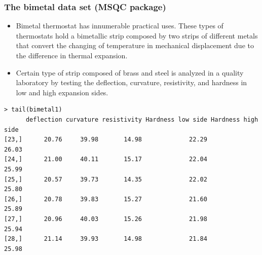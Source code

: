 \documentclass[SPC-MASTER.tex]{subfiles}
\begin{document}
\subsubsection{The bimetal data set (MSQC package)}
{\large
\begin{itemize}
\item Bimetal thermostat has innumerable practical uses. These types of thermostats hold
a bimetallic strip composed by two strips of different metals that convert the
changing of temperature in mechanical displacement due to the difference in
thermal expansion.
\item Certain type of strip composed of brass and steel is analyzed in a quality
laboratory by testing the deflection, curvature, resistivity, and hardness in low
and high expansion sides.
\end{itemize}
{
\large

\begin{verbatim}
> tail(bimetal1)
      deflection curvature resistivity Hardness low side Hardness high side
[23,]      20.76     39.98       14.98             22.29             26.03
[24,]      21.00     40.11       15.17             22.04             25.99
[25,]      20.57     39.73       14.35             22.02             25.80
[26,]      20.78     39.83       15.27             21.60             25.89
[27,]      20.96     40.03       15.26             21.98             25.94
[28,]      21.14     39.93       14.98             21.84             25.98


\end{verbatim}}}
\end{document}
